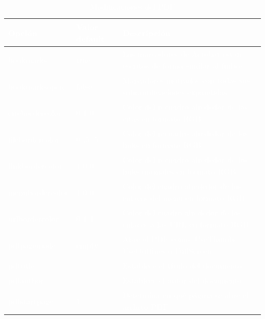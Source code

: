 \documentclass[12pt,letterpaper]{article}
\begin{document}
\begin{table}[h]
    \caption{\textcolor{white}{Modificaciones del PDF}}
    \label{tabl mods PDF}
    \centering
    \begin{tabular}{|l|l|l|}\hline
        \textcolor{white}{\textbf{Opción}} & \textcolor{white}{\textbf{Valor default}} & \textcolor{white}{\textbf{Descripción}}\\\hline
        \textcolor{white}{bookmarks} & \textcolor{white}{true} & \textcolor{white}{Los marcadores de Acrobat están escritos de forma similar al índice}\\\hline
        \textcolor{white}{bookmarksopen} & \textcolor{white}{false} & \textcolor{white}{Marcadores motrados con todas sus subramificaciones expandidas}\\\hline
        \textcolor{white}{citebordercolor} & \textcolor{white}{0 1 0} & \textcolor{white}{Color del recuadro alrededor de las citas en formato RGB}\\\hline
        \textcolor{white}{filebordercolor} & \textcolor{white}{0 .5 .5} & \textcolor{white}{Color del recuadro alrededor de los links en formato RGB}\\\hline
        \textcolor{white}{linkbordercolor} & \textcolor{white}{1 0 0} & \textcolor{white}{Color del recuadro alrededor de los links normales en formato RGB}\\\hline
        \textcolor{white}{menubordercolor} & \textcolor{white}{1 0 0} & \textcolor{white}{Color del cuadro alrededor de los enlaces del menú en formato RGB}\\\hline
        \textcolor{white}{urlbordercolor} & \textcolor{white}{0 1 1} & \textcolor{white}{Color del cuadro alrededor de los enlaces a las URL en formato RGB}\\\hline
        \textcolor{white}{pdfpagemode} & \textcolor{white}{empty} & \textcolor{white}{Abre el PDF como: UseThumbs, UseOutlines o FullScreen}\\\hline
        \textcolor{white}{pdftitle} &  & \textcolor{white}{Establece el título del documento}\\\hline
        \textcolor{white}{pdfauthor} &  & \textcolor{white}{Establece el autor del documento}\\\hline
        \textcolor{white}{pdfstartpage} & \textcolor{white}{1} & \textcolor{white}{Determina en qué página se abre el archivo PDF}\\\hline
    \end{tabular}
\end{table}

\printbibliography
\end{document}
